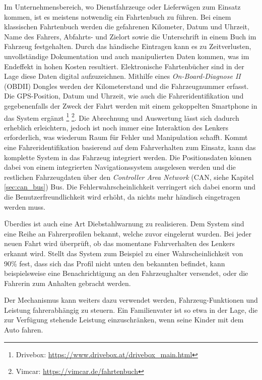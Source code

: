 Im Unternehmensbereich, wo Dienstfahrzeuge oder Lieferwägen zum Einsatz kommen, ist es meistens notwendig ein Fahrtenbuch zu führen. Bei einem klassischen Fahrtenbuch werden die gefahrenen Kilometer, Datum und Uhrzeit, Name des Fahrers, Abfahrts- und Zielort sowie die Unterschrift in einem Buch im Fahrzeug festgehalten. Durch das händische Eintragen kann es zu Zeitverlusten, unvollständige Dokumentation und auch manipulierten Daten kommen, was im Endeffekt in hohen Kosten resultiert. Elektronische Fahrtenbücher sind in der Lage diese Daten digital aufzuzeichnen. Mithilfe eines \textit{On-Board-Diagnose II} (OBDII) Dongles werden der Kilometerstand und die Fahrzeugnummer erfasst. Die GPS-Position, Datum und Uhrzeit, wie auch die Fahreridentifikation und gegebenenfalls der Zweck der Fahrt werden mit einem gekoppelten Smartphone in das System ergänzt \footnote{Drivebox: \url{https://www.drivebox.at/drivebox_main.html}} \footnote{Vimcar: \url{https://vimcar.de/fahrtenbuch}}. Die Abrechnung und Auswertung lässt sich dadurch erheblich erleichtern, jedoch ist noch immer eine Interaktion des Lenkers erforderlich, was wiederum Raum für Fehler und Manipulation schafft. Kommt eine Fahreridentifikation basierend auf dem Fahrverhalten zum Einsatz, kann das komplette System in das Fahrzeug integriert werden. Die Positionsdaten können dabei von einem integrierten Navigationssystem ausgelesen werden und die restlichen Fahrzeugdaten über den \textit{Controller Area Network} (CAN, siehe Kapitel \ref{sec:can_bus}) Bus. Die Fehlerwahrscheinlichkeit verringert sich dabei enorm und die Benutzerfreundlichkeit wird erhöht, da nichts mehr händisch eingetragen werden muss.

Überdies ist auch eine Art Diebstahlwarnung zu realisieren. Dem System sind eine Reihe an Fahrerprofilen bekannt, welche zuvor eingelernt wurden. Bei jeder neuen Fahrt wird überprüft, ob das momentane Fahrverhalten des Lenkers erkannt wird. Stellt das System zum Beispiel zu einer Wahrscheinlichkeit von 90\% fest, dass sich das Profil nicht unten den bekannten befindet, kann beispielsweise eine Benachrichtigung an den Fahrzeughalter versendet, oder die Fahrerin zum Anhalten gebracht werden.

Der Mechanismus kann weiters dazu verwendet werden, Fahrzeug-Funktionen und Leistung fahrerabhängig zu steuern. Ein Familienvater ist so etwa in der Lage, die zur Verfügung stehende Leistung einzuschränken, wenn seine Kinder mit dem Auto fahren.

